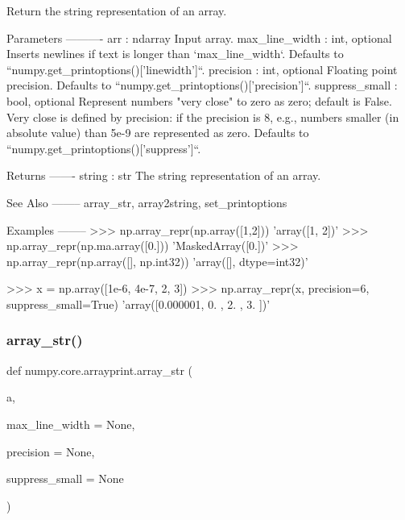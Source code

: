 \begin{DoxyVerb}Return the string representation of an array.

Parameters
----------
arr : ndarray
    Input array.
max_line_width : int, optional
    Inserts newlines if text is longer than `max_line_width`.
    Defaults to ``numpy.get_printoptions()['linewidth']``.
precision : int, optional
    Floating point precision.
    Defaults to ``numpy.get_printoptions()['precision']``.
suppress_small : bool, optional
    Represent numbers "very close" to zero as zero; default is False.
    Very close is defined by precision: if the precision is 8, e.g.,
    numbers smaller (in absolute value) than 5e-9 are represented as
    zero.
    Defaults to ``numpy.get_printoptions()['suppress']``.

Returns
-------
string : str
  The string representation of an array.

See Also
--------
array_str, array2string, set_printoptions

Examples
--------
>>> np.array_repr(np.array([1,2]))
'array([1, 2])'
>>> np.array_repr(np.ma.array([0.]))
'MaskedArray([0.])'
>>> np.array_repr(np.array([], np.int32))
'array([], dtype=int32)'

>>> x = np.array([1e-6, 4e-7, 2, 3])
>>> np.array_repr(x, precision=6, suppress_small=True)
'array([0.000001,  0.      ,  2.      ,  3.      ])'\end{DoxyVerb}
 \mbox{\label{namespacenumpy_1_1core_1_1arrayprint_a4e8029365da7c199289976fcae0e8af8}} 
\subsubsection{\texorpdfstring{array\+\_\+str()}{array\_str()}}
{\footnotesize\ttfamily def numpy.\+core.\+arrayprint.\+array\+\_\+str (\begin{DoxyParamCaption}\item[{}]{a,  }\item[{}]{max\+\_\+line\+\_\+width = {\ttfamily None},  }\item[{}]{precision = {\ttfamily None},  }\item[{}]{suppress\+\_\+small = {\ttfamily None} }\end{DoxyParamCaption})}

